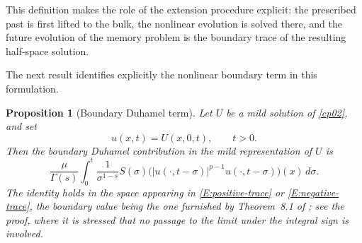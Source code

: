 \documentclass[11pt,letter]{amsart}
\def \G{\Gamma}
\numberwithin{equation}{section}
\newtheorem{proposition}[theorem]{Proposition}
\numberwithin{equation}{section}
\begin{document}
This definition makes the role of the extension procedure explicit:
the prescribed past is first lifted to the bulk, the nonlinear
evolution is solved there, and the future evolution of the memory
problem is the boundary trace of the resulting half-space solution.

The next result identifies explicitly the nonlinear boundary term in
this formulation.

\begin{proposition}[Boundary Duhamel term]
\label{P:boundary-Duhamel}
Let \(U\) be a mild solution of \eqref{cp02}, and set
\[
u(x,t)=U(x,0,t),\qquad t>0.
\]
Then the boundary Duhamel contribution in the mild representation of
\(U\) is
\begin{equation}\label{E:boundary-Duhamel}
\frac{\mu}{\G(s)}
\int_0^t
\frac{1}{\sigma^{1-s}}
S(\sigma)
\bigl(
|u(\cdot,t-\sigma)|^{p-1}
u(\cdot,t-\sigma)
\bigr)(x)\,d\sigma .
\end{equation}
The identity holds in the space appearing in \eqref{E:positive-trace} or
\eqref{E:negative-trace}, the boundary value being the one furnished by
Theorem~8.1 of \cite{GS2}; see the proof, where it is stressed that no passage
to the limit under the integral sign is involved.
\end{proposition}
\end{document}
